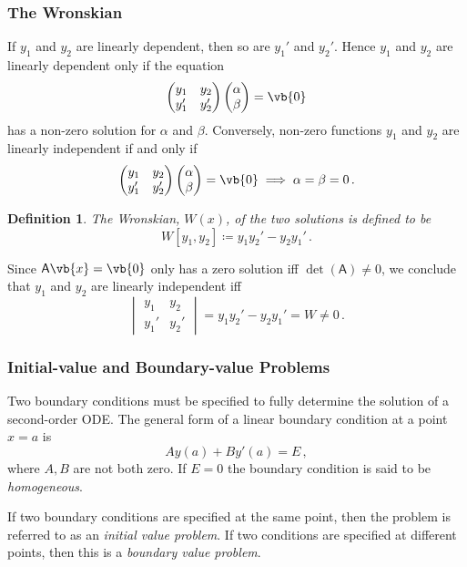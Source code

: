 \documentclass{article}
\theoremstyle{plain}\theoremheaderfont{\normalfont\itshape}\theorembodyfont{\rmfamily}\theoremseparator{.}\newtheorem*{rem}{Remark}\newtheorem*{ex}{Example}\newtheorem*{proof}{Proof}\newtheorem*{altp}{Alternative proof}
\theoremstyle{plain}\theoremheaderfont{\normalfont\bfseries}\theorembodyfont{\rmfamily}\theoremseparator{.}\newtheorem{thm}{Theorem}[section]\newtheorem{lem}[thm]{Lemma}\newtheorem{prop}[thm]{Proposition}\newtheorem*{cor}{Corollary}\newtheorem{defn}[thm]{Definition}\newtheorem{clm}[thm]{Claim}\newtheorem{clminproof}{Claim}
\theoremstyle{break}\theoremheaderfont{\normalfont\itshape}\theorembodyfont{\rmfamily}\theoremseparator{.\medskip}\newtheorem*{proofskip}{Proof}\newtheorem*{exs}{Examples}\newtheorem*{rems}{Remarks}
\theoremstyle{break}\theoremheaderfont{\normalfont\bfseries}\theorembodyfont{\rmfamily}\theoremseparator{.\medskip}\newtheorem{lemskip}[thm]{Lemma}\newtheorem{defnskip}[thm]{Definition}\newtheorem{propskip}[thm]{Proposition}\newtheorem{thmskip}[thm]{Theorem}
\numberwithin{equation}{section}
\begin{document}
	\subsubsection{The Wronskian}
	If \(y_1\) and \(y_2\) are linearly dependent, then so are \(y_1'\) and \(y_2'\). Hence \(y_1\) and \(y_2\) are linearly dependent only if the equation
	\[\begin{pmatrix}
		y_1 & y_2\\
		y_1' & y_2'
	\end{pmatrix}
	\begin{pmatrix}
		\alpha\\
		\beta
	\end{pmatrix}=\vb{0}\]
	has a non-zero solution for \(\alpha\) and \(\beta\). Conversely, non-zero functions \(y_1\) and \(y_2\) are linearly independent if and only if
	\[\begin{pmatrix}
		y_1 & y_2\\
		y_1' & y_2'
	\end{pmatrix}
	\begin{pmatrix}
		\alpha\\
		\beta
	\end{pmatrix}=\vb{0}\implies\alpha=\beta=0\,.\]
	
	\begin{defn}
		The \textit{Wronskian}, \(W(x)\), of the two solutions is defined to be
		\[W[y_1,y_2]\coloneqq y_1y_2'-y_2y_1'\,.\]
	\end{defn}
	Since \(\mathsf{A}\vb{x}=\vb{0}\) only has a zero solution iff \(\det(\mathsf{A})\ne 0\), we conclude that \(y_1\) and \(y_2\) are linearly independent iff
	\[\begin{vmatrix}
		y_1 & y_2\\
		y_1' & y_2'
	\end{vmatrix}=y_1y_2'-y_2y_1'=W\ne0\,.\]
	
	\subsubsection{Initial-value and Boundary-value Problems}
	Two boundary conditions must be specified to fully determine the solution of a second-order ODE. The general form of a linear boundary condition at a point \(x=a\) is
	\[Ay(a)+By'(a)=E\,,\]
	where \(A, B\) are not both zero. If \(E=0\) the boundary condition is said to be \textit{homogeneous}.

	If two boundary conditions are specified at the same point, then the problem is referred to as an \textit{initial value problem}. If two conditions are specified at different points, then this is a \textit{boundary value problem}.
	
\end{document}
